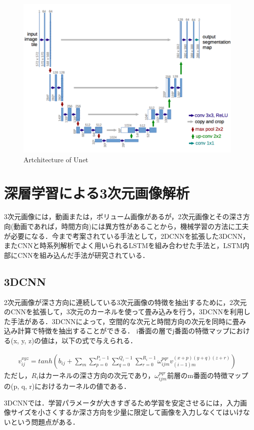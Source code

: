 \begin{figure}[H]
	\centering
	\includegraphics[width=0.7\linewidth]{fig/unet.png}
	\caption{Artchitecture of Unet}
	\label{fig:Unet}
\end{figure}

\section{深層学習による3次元画像解析}
3次元画像には，動画または，ボリューム画像があるが，2次元画像とその深さ方向(動画であれば，時間方向)には異方性があることから，機械学習の方法に工夫が必要になる．今まで考案されている手法として，2DCNNを拡張した3DCNN，またCNNと時系列解析でよく用いられるLSTMを組み合わせた手法と，LSTM内部にCNNを組み込んだ手法が研究されている．


\subsection{3DCNN}
2次元画像が深さ方向に連続している3次元画像の特徴を抽出するために，2次元のCNNを拡張して，3次元のカーネルを使って畳み込みを行う，3DCNNを利用した手法がある．3DCNNによって，空間的な次元と時間方向の次元を同時に畳み込み計算で特徴を抽出することができる．\cite{ji20133d}
i番面の層でj番面の特徴マップにおける(x, y, z)の値は，以下の式で与えられる．

\begin{align}\label{eq:3dcnn}
v_{ij}^{xyz} = tanh(b_{ij} + \sum_{m} \sum_{p=0}^{P_i -1}　\sum_{q=0}^{Q_i -1}　\sum_{r=0}^{R_i -1} \omega_{ijm}^{pqr} v_{(i-1)m}^{(x+p)(y+q)(z+r)})
\end{align}
ただし，$R_i$はカーネルの深さ方向の次元であり，$\omega_{ijm}^{pqr}$前層のm番面の特徴マップの(p, q, r)におけるカーネルの値である．

3DCNNでは．学習パラメータが大きすぎるため学習を安定させるには，入力画像サイズを小さくするか深さ方向を少量に限定して画像を入力しなくてはいけないという問題点がある．

